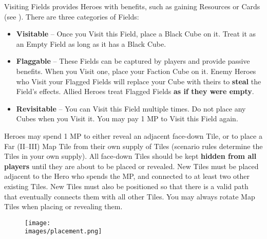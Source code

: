 \begin{multicols}{2}

Visiting Fields provides Heroes with benefits, such as gaining Resources or Cards (see ).
There are three categories of Fields:
\begin{itemize}
  \item \textbf{Visitable} – Once you Visit this Field, place a Black Cube on it.
    Treat it as an Empty Field as long as it has a Black Cube.
  \item \textbf{Flaggable} – These Fields can be captured by players and provide passive benefits.
    When you Visit one, place your Faction Cube on it.
    Enemy Heroes who Visit your Flagged Fields will replace your Cube with theirs to \textbf{steal} the Field’s effects.
    Allied Heroes treat Flagged Fields \textbf{as if they were empty}.
  \item \textbf{Revisitable} – You can Visit this Field multiple times.
    Do not place any Cubes when you Visit it.
    You may pay 1 MP to Visit this Field again.
\end{itemize}
\vspace*{\fill}
\columnbreak

Heroes may spend 1 MP to either reveal an adjacent face-down Tile, or to place a Far (II–III) Map Tile from their own supply of Tiles (scenario rules determine the Tiles in your own supply).
All face-down Tiles should be kept \textbf{hidden from all players} until they are about to be placed or revealed.
New Tiles must be placed adjacent to the Hero who spends the MP, and connected to at least two other existing Tiles.
New Tiles must also be positioned so that there is a valid path that eventually connects them with all other Tiles.
You may always rotate Map Tiles when placing or revealing them.

\medskip
{}

\end{multicols}

\vspace*{-1em}
\begin{figure*}[!hb]
  \centering
  \texttt{[image: \\images/placement.png]}
\end{figure*}

